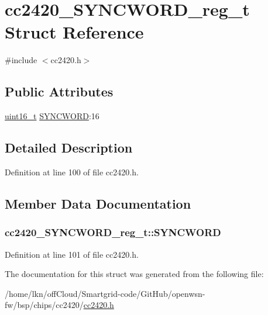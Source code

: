 \hypertarget{structcc2420___s_y_n_c_w_o_r_d__reg__t}{}\section{cc2420\+\_\+\+S\+Y\+N\+C\+W\+O\+R\+D\+\_\+reg\+\_\+t Struct Reference}
\label{structcc2420___s_y_n_c_w_o_r_d__reg__t}


{\ttfamily \#include $<$cc2420.\+h$>$}

\subsection*{Public Attributes}
\begin{DoxyCompactItemize}
\item 
\hyperlink{_p_e___types_8h_a1f1825b69244eb3ad2c7165ddc99c956}{uint16\+\_\+t} \hyperlink{structcc2420___s_y_n_c_w_o_r_d__reg__t_a1744ba8dad931e13323a956b1a902633}{S\+Y\+N\+C\+W\+O\+RD}\+:16
\end{DoxyCompactItemize}


\subsection{Detailed Description}


Definition at line 100 of file cc2420.\+h.



\subsection{Member Data Documentation}
\subsubsection[{\texorpdfstring{S\+Y\+N\+C\+W\+O\+RD}{SYNCWORD}}]{ cc2420\+\_\+\+S\+Y\+N\+C\+W\+O\+R\+D\+\_\+reg\+\_\+t\+::\+S\+Y\+N\+C\+W\+O\+RD}\hypertarget{structcc2420___s_y_n_c_w_o_r_d__reg__t_a1744ba8dad931e13323a956b1a902633}{}\label{structcc2420___s_y_n_c_w_o_r_d__reg__t_a1744ba8dad931e13323a956b1a902633}


Definition at line 101 of file cc2420.\+h.



The documentation for this struct was generated from the following file\+:\begin{DoxyCompactItemize}
\item 
/home/lkn/off\+Cloud/\+Smartgrid-\/code/\+Git\+Hub/openwsn-\/fw/bsp/chips/cc2420/\hyperlink{cc2420_8h}{cc2420.\+h}\end{DoxyCompactItemize}
